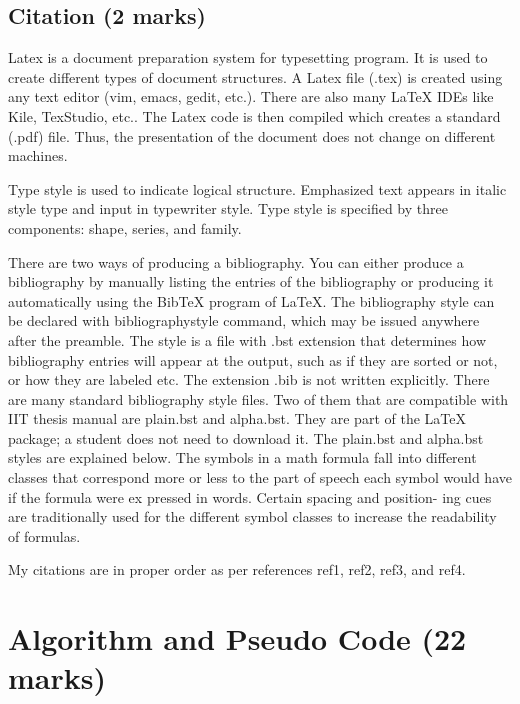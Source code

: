 \documentclass[12pt]{article}
\begin{document}
\subsection{Citation (2 marks)}
\noindent Latex \cite{some} is a document preparation system for typesetting program. It is used to create different types of document structures. A Latex file (.tex) is created using any text editor (vim, emacs, gedit, etc.). There are also many LaTeX IDEs like Kile, TexStudio, etc.. The Latex code is then compiled which creates a standard (.pdf) file. Thus, the presentation of the document does not change on different machines.
\par 
\noindent Type style \cite{some2} is used to indicate logical structure. Emphasized text appears in
italic style type and input in typewriter style. Type style is specified by three
components: shape, series, and family. \newline
\par
There are two ways of producing a bibliography\cite{some3}. You can either produce
a bibliography by manually listing the entries of the bibliography or producing
it automatically using the BibTeX program of LaTeX. The bibliography style can
be declared with bibliographystyle command, which may be issued anywhere
after the preamble. The style is a file with .bst extension that determines how
bibliography entries will appear at the output, such as if they are sorted or not,
or how they are labeled etc. The extension .bib is not written explicitly. There
are many standard bibliography style files. Two of them that are compatible
with IIT thesis manual are plain.bst and alpha.bst. They are part of the LaTeX
package; a student does not need to download it. The plain.bst and alpha.bst
styles are explained below. The symbols in a math formula fall into different
classes that correspond more or less to the part of speech each symbol would
have if the formula were ex pressed in words. Certain spacing and position-
ing cues are traditionally used for the different symbol classes to increase the
readability of formulas. \cite{some4}
\par 
My citations are in proper order as per references ref1, ref2, ref3, and ref4.
\pagebreak
\section{Algorithm and Pseudo Code (22 marks)}
\end{document}

